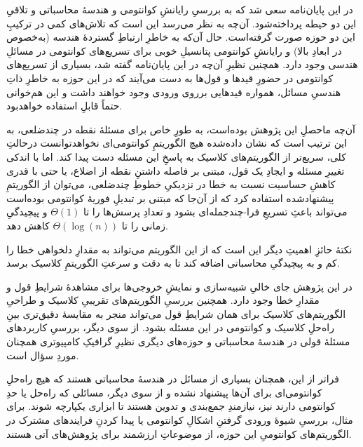 

در این پایان‌نامه سعی شد که به بررسیِ رایانشِ کوانتومی و هندسهٔ محاسباتی و تلاقیِ این دو حیطه پرداخته‌شود. آن‌چه به نظر می‌رسد این است که تلاش‌های کمی در ترکیبِ این دو حوزه صورت گرفته‌است. حال آن‌که به خاطرِ ارتباطِ گستردهٔ هندسه (به‌خصوص در ابعادِ بالا) و رایانشِ کوانتومی پتانسیلِ خوبی برای تسریع‌های کوانتومی در مسائلِ هندسی وجود دارد.
همچنین نظیرِ آن‌چه در این پایان‌نامه گفته شد، بسیاری از تسریع‌های کوانتومی در حضورِ قیدها و قول‌ها به دست می‌آیند که در این حوزه به خاطرِ ذاتِ هندسیِ مسائل، همواره قیدهایی برروی ورودی وجود خواهند داشت و این هم‌خوانی حتماً قابلِ استفاده خواهدبود.

آن‌چه ماحصلِ این پژوهش بوده‌است، به طورِ خاص برای مسئلهٔ نقطه در چندضلعی، به این ترتیب است که نشان داده‌شده هیچ الگوریتمِ کوانتومی‌ای نخواهدتوانست درحالتِ کلی، سریع‌تر از الگوریتم‌های کلاسیک به پاسخِ این مسئله دست پیدا کند. اما با اندکی تغییرِ مسئله و ایجادِ یک قول، مبتنی بر فاصله داشتنِ نقطه از اضلاع، یا حتی با قدری کاهشِ حساسیت نسبت به خطا در نزدیکیِ خطوطِ چندضلعی، می‌توان از الگوریتمِ پیشنهادشده استفاده کرد که از آن‌جا که مبتنی بر تبدیلِ فوریهٔ کوانتومی بوده‌است می‌تواند باعثِ تسریعِ فرا-چندجمله‌ای بشود و تعدادِ پرسش‌ها را تا $\Theta(1)$ و پیچیدگیِ زمانی را تا 
$\Theta(\log(n))$
کاهش دهد.

نکتهٔ حائزِ اهمیتِ دیگر این است که از این الگوریتم می‌تواند به مقدارِ دلخواهی خطا را کم و به پیچیدگیِ محاسباتی اضافه کند تا به دقت و سرعتِ الگوریتمِ کلاسیک برسد.


در این پژوهش جای خالیِ شبیه‌سازی و نمایشِ خروجی‌ها برای مشاهدهٔ شرایطِ قول و مقدارِ خطا وجود دارد. همچنین بررسیِ الگوریتم‌های تقریبیِ کلاسیک و طراحیِ الگوریتم‌های کلاسیک برای همان شرایطِ قول می‌تواند منجر به مقایسهٔ دقیق‌تری بینِ راه‌حلِ کلاسیک و کوانتومی در این مسئله بشود. از سوی دیگر، بررسیِ کاربردهای مسئلهٔ قولی در هندسهٔ محاسباتی و حوزه‌های دیگری نظیرِ گرافیکِ کامپیوتری همچنان موردِ سؤال است.

فراتر از این، همچنان بسیاری از مسائل در هندسهٔ محاسباتی هستند که هیچ راه‌حلِ کوانتومی‌ای برای آن‌ها پیشنهاد نشده و از سوی دیگر، مسائلی که راه‌حل یا حدِ کوانتومی دارند نیز، نیازمندِ جمع‌بندی و تدوین هستند تا ابزاری یکپارچه شوند. برای مثال، بررسیِ شیوهٔ ورودی گرفتنِ اشکالِ کوانتومی یا پیدا کردنِ فرایندهای مشترک در الگوریتم‌های کوانتومیِ این حوزه، از موضوعاتِ ارزشمند برای پژوهش‌های آتی هستند.